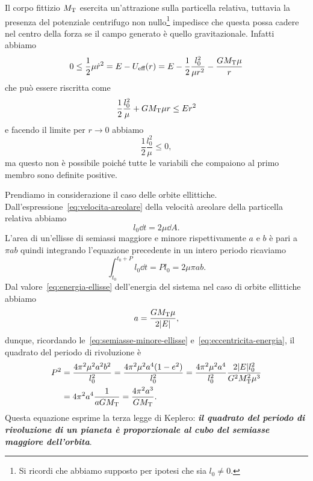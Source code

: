 {Il corpo fittizio $M_\textup{T}$ esercita un'attrazione sulla particella
relativa, tuttavia la presenza del potenziale centrifugo non
nullo\footnote{Si ricordi che abbiamo supposto per ipotesi che sia $l_0\neq 0$.}
impedisce che questa possa cadere nel centro della forza se il campo generato è
quello gravitazionale. Infatti abbiamo
\begin{equation}
  0\leq \frac{1}{2}\mu\dot{r}^2 = E - U_\textup{eff}(r) = E -
  \frac{1}{2}\frac{l_0^2}{\mu r^2} - \frac{GM_\textup{T}\mu}{r}
\end{equation}
che può essere riscritta come
\begin{equation}
  \frac{1}{2}\frac{l_0^2}{\mu} + GM_\textup{T}\mu r \leq Er^2
\end{equation}
e facendo il limite per $r \to 0$ abbiamo
\begin{equation}
  \frac{1}{2}\frac{l_0^2}{\mu} \leq 0,
\end{equation}
ma questo non è possibile poiché tutte le variabili che compaiono al primo
membro sono definite positive.

Prendiamo in considerazione il caso delle orbite
ellittiche. Dall'espressione~\eqref{eq:velocita-areolare} della velocità
areolare della particella relativa abbiamo
\begin{equation}
  l_0 \dd t = 2\mu\dd A.
\end{equation}
L'area di un'ellisse di semiassi maggiore e minore rispettivamente $a$ e $b$ è
pari a $\pi ab$ quindi integrando l'equazione precedente in un intero periodo
ricaviamo
\begin{equation}
    \int_{t_0}^{t_0+P} l_0\dd t = Pl_0 = 2\mu\pi ab.
\end{equation}
Dal valore~\eqref{eq:energia-ellisse} dell'energia del sistema nel caso di
orbite ellittiche abbiamo
\begin{equation}
  a = \frac{GM_\textup{T}\mu}{2\lvert E\rvert},
\end{equation}
dunque, ricordando le~\eqref{eq:semiasse-minore-ellisse}
e~\eqref{eq:eccentricita-energia}, il quadrato del periodo di rivoluzione è
\begin{equation}
  \label{eq:terza-legge-keplero}
  \begin{split}
    P^2 &= \frac{4\pi^2\mu^2a^2b^2}{l_0^2} = \frac{4\pi^2\mu^2a^4(1-e^2)}{l_0^2}
    = \frac{4\pi^2\mu^2a^4}{l_0^2}\frac{2\lvert E\rvert l_0^2}{G^2M_\textup{T}^2\mu^3} \\
    &= 4\pi^2a^4\frac{1}{aGM_\textup{T}} = \frac{4\pi^2a^3}{GM_\textup{T}}.
  \end{split}
\end{equation}
Questa equazione esprime la terza legge di Keplero: \textbf{\emph{il quadrato
    del periodo di rivoluzione di un pianeta è proporzionale al cubo del
    semiasse maggiore dell'orbita}}.

}
